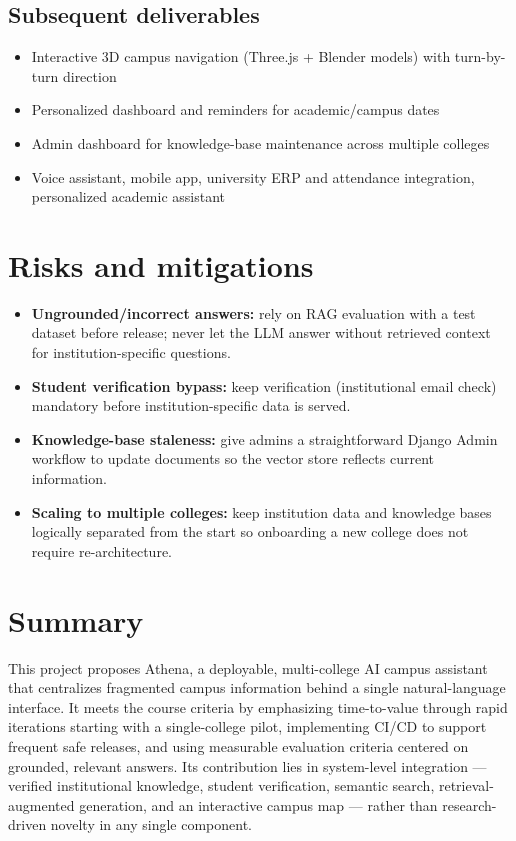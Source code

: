 \documentclass[11pt,a4paper]{article}
\begin{document}
\subsection{Subsequent deliverables}
\begin{itemize}[leftmargin=0.7cm]
    \item Interactive 3D campus navigation (Three.js + Blender models) with turn-by-turn direction
    \item Personalized dashboard and reminders for academic/campus dates
    \item Admin dashboard for knowledge-base maintenance across multiple colleges
    \item Voice assistant, mobile app, university ERP and attendance integration, personalized academic assistant
\end{itemize}

\section{Risks and mitigations}
\begin{itemize}[leftmargin=0.7cm]
    \item \textbf{Ungrounded/incorrect answers:} rely on RAG evaluation with a test dataset before release; never let the LLM answer without retrieved context for institution-specific questions.
    \item \textbf{Student verification bypass:} keep verification (institutional email check) mandatory before institution-specific data is served.
    \item \textbf{Knowledge-base staleness:} give admins a straightforward Django Admin workflow to update documents so the vector store reflects current information.
    \item \textbf{Scaling to multiple colleges:} keep institution data and knowledge bases logically separated from the start so onboarding a new college does not require re-architecture.
\end{itemize}

\section{Summary}
This project proposes Athena, a deployable, multi-college AI campus
assistant that centralizes fragmented campus information behind a
single natural-language interface. It meets the course criteria by
emphasizing time-to-value through rapid iterations starting with a
single-college pilot, implementing CI/CD to support frequent safe
releases, and using measurable evaluation criteria centered on
grounded, relevant answers. Its contribution lies in system-level
integration --- verified institutional knowledge, student
verification, semantic search, retrieval-augmented generation, and an
interactive campus map --- rather than research-driven novelty in any
single component.
\end{document}
